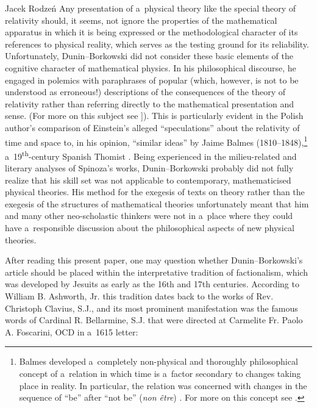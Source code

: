 \begin{artengenv}{Jacek Rodzeń}
Any presentation of a~physical theory like the special theory of relativity should, it seems, not ignore the properties of the mathematical apparatus in which it is being expressed or the methodological character of its references to physical reality, which serves as the testing ground for its reliability. Unfortunately, Dunin–Borkowski did not consider these basic elements of the cognitive character of mathematical physics. In his philosophical discourse, he engaged in polemics with paraphrases of popular (which, however, is not to be understood as erroneous!) descriptions of the consequences of the theory of relativity rather than referring directly to the mathematical presentation and sense. (For more on this subject see
\parencite[][pp.101–102]{heller_physics_1999}%
]). This is particularly evident in the Polish author's comparison of Einstein's alleged ``speculations'' about the relativity of time and space to, in his opinion, ``similar ideas'' by Jaime Balmes (1810–1848),\footnote{Balmes developed a~completely non-physical and thoroughly philosophical concept of a~relation in which time is a~factor secondary to changes taking place in reality. In particular, the relation was concerned with changes in the sequence of ``be'' after ``not be'' (\textit{non être}) 
\parencite[cf.][]{balmes_philosophie_1852}. %
 For more on this concept see 
\parencite[][pp.678–683]{wojciechowski_teorie_1955}.%
} a~19\textsuperscript{th}-century Spanish Thomist 
\parencite[][p.275]{dunin-borkowski_auf_1921}. %
 Being experienced in the milieu-related and literary analyses of Spinoza's works, Dunin–Borkowski probably did not fully realize that his skill set was not applicable to contemporary, mathematicised physical theories. His method for the exegesis of texts on theory rather than the exegesis of the structures of mathematical theories unfortunately meant that him and many other neo-scholastic thinkers were not in a~place where they could have a~responsible discussion about the philosophical aspects of new physical theories.

After reading this present paper, one may question whether Dunin–Borkowski's article should be placed within the interpretative tradition of factionalism, which was developed by Jesuits as early as the 16th and 17th centuries. According to William B. Ashworth, Jr. this tradition dates back to the works of Rev. Christoph Clavius, S.J., and its most prominent manifestation was the famous words of Cardinal R. Bellarmine, S.J. that were directed at Carmelite Fr. Paolo A. Foscarini, OCD in a~1615 letter:


\end{artengenv}
